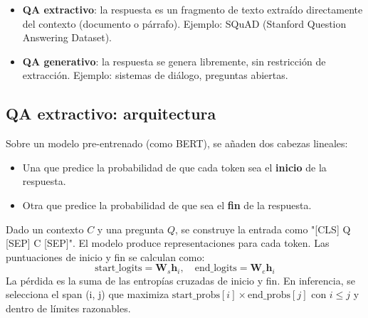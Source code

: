 \documentclass[12pt,a4paper,openany,oneside]{book}
\begin{document}
\begin{itemize}
    \item \textbf{QA extractivo}: la respuesta es un fragmento de texto extraído directamente del contexto (documento o párrafo). Ejemplo: SQuAD (Stanford Question Answering Dataset).
    \item \textbf{QA generativo}: la respuesta se genera libremente, sin restricción de extracción. Ejemplo: sistemas de diálogo, preguntas abiertas.
\end{itemize}

\subsection{QA extractivo: arquitectura}
Sobre un modelo pre-entrenado (como BERT), se añaden dos cabezas lineales:
\begin{itemize}
    \item Una que predice la probabilidad de que cada token sea el \textbf{inicio} de la respuesta.
    \item Otra que predice la probabilidad de que sea el \textbf{fin} de la respuesta.
\end{itemize}

Dado un contexto \(C\) y una pregunta \(Q\), se construye la entrada como "[CLS] Q [SEP] C [SEP]". El modelo produce representaciones para cada token. Las puntuaciones de inicio y fin se calculan como:
\[
\text{start\_logits} = \mathbf{W}_s \mathbf{h}_i, \quad \text{end\_logits} = \mathbf{W}_e \mathbf{h}_i
\]
La pérdida es la suma de las entropías cruzadas de inicio y fin. En inferencia, se selecciona el span (i, j) que maximiza \(\text{start\_probs}[i] \times \text{end\_probs}[j]\) con \(i \le j\) y dentro de límites razonables.

\begin{center}
\caption{QA extractivo: se predicen probabilidades de inicio (arriba) y fin (abajo). La respuesta sería "Steve Jobs" (inicio en c1, fin en c2).}
\end{center}
\end{document}
